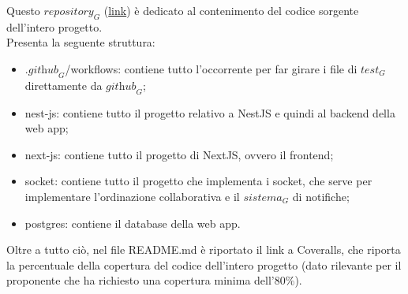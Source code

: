Questo $\textit{repository}_G$ (\href{https://github.com/RAMtastic6/EasyMeal}{link}) è dedicato al contenimento del codice sorgente dell'intero progetto. \\
Presenta la seguente struttura:
\begin{itemize}
    \item .$\textit{github}_G$/workflows: contiene tutto l'occorrente per far girare i file di $\textit{test}_G$ direttamente da $\textit{github}_G$;
    \item nest-js: contiene tutto il progetto relativo a NestJS e quindi al backend della web app;
    \item next-js: contiene tutto il progetto di NextJS, ovvero il frontend;
    \item socket: contiene tutto il progetto che implementa i socket, che serve per implementare l’ordinazione collaborativa e il $\textit{sistema}_G$ di notifiche;
    \item postgres: contiene il database della web app.
\end{itemize}
Oltre a tutto ciò, nel file README.md è riportato il link a Coveralls, che riporta la percentuale della copertura del codice dell'intero progetto (dato rilevante per il proponente che ha richiesto una copertura minima dell'80\%).


